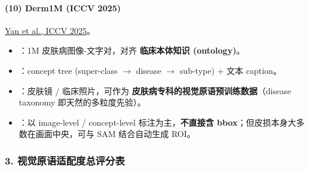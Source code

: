 \paragraph{(10) Derm1M (ICCV 2025)}

\href{https://openaccess.thecvf.com/content/ICCV2025/papers/Yan_Derm1M_A_Million-scale_Vision-Language_Dataset_Aligned_with_Clinical_Ontology_Knowledge_ICCV_2025_paper.pdf}{Yan et al., ICCV 2025}。

\begin{itemize}[leftmargin=1.5em]
  \item {}：1M 皮肤病图像-文字对，对齐 \textbf{临床本体知识 (ontology)}。
  \item {}：concept tree (super-class $\to$ disease $\to$ sub-type) + 文本 caption。
  \item {}：皮肤镜 / 临床照片，可作为 \textbf{皮肤病专科的视觉原语预训练数据}（disease taxonomy 即天然的多粒度先验）。
  \item {}：以 image-level / concept-level 标注为主，\textbf{不直接含 bbox}；但皮损本身大多数在画面中央，可与 SAM 结合自动生成 ROI。
\end{itemize}

\subsubsection*{3. 视觉原语适配度总评分表}

